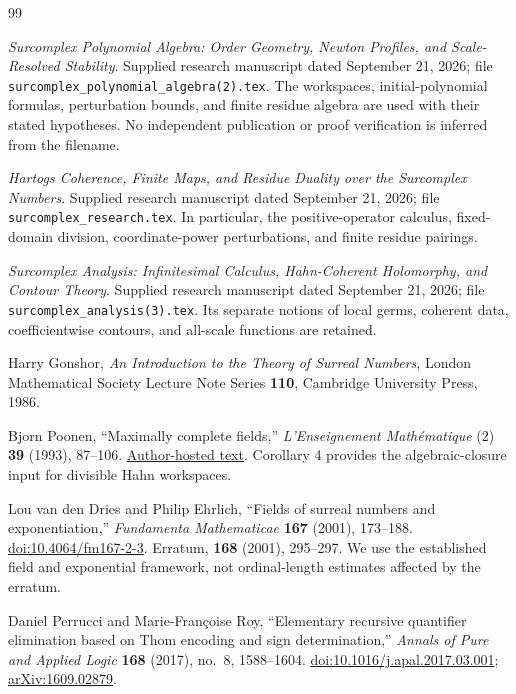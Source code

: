 \documentclass[11pt,letterpaper]{article}
\numberwithin{equation}{section}
\theoremstyle{definition}
\theoremstyle{remark}\newtheorem{remark}[theorem]{Remark}
\begin{document}
\clearpage
\begin{thebibliography}{99}
\small

\emph{Surcomplex Polynomial Algebra: Order Geometry, Newton Profiles, and
Scale-Resolved Stability}. Supplied research manuscript dated September 21,
2026; file \texttt{surcomplex\_polynomial\_algebra(2).tex}. The workspaces,
initial-polynomial formulas, perturbation bounds, and finite residue algebra
are used with their stated hypotheses. No independent publication or proof
verification is inferred from the filename.

\emph{Hartogs Coherence, Finite Maps, and Residue Duality over the Surcomplex
Numbers}. Supplied research manuscript dated September 21, 2026; file
\texttt{surcomplex\_research.tex}. In particular, the positive-operator
calculus, fixed-domain division, coordinate-power perturbations, and finite
residue pairings.

\emph{Surcomplex Analysis: Infinitesimal Calculus, Hahn-Coherent Holomorphy,
and Contour Theory}. Supplied research manuscript dated September 21, 2026;
file \texttt{surcomplex\_analysis(3).tex}. Its separate notions of local germs,
coherent data, coefficientwise contours, and all-scale functions are retained.

Harry Gonshor, \emph{An Introduction to the Theory of Surreal Numbers},
London Mathematical Society Lecture Note Series \textbf{110}, Cambridge
University Press, 1986.

Bjorn Poonen, ``Maximally complete fields,'' \emph{L'Enseignement
Math\'ematique} (2) \textbf{39} (1993), 87--106.
\href{https://math.mit.edu/~poonen/papers/amsval.pdf}{Author-hosted text}.
Corollary 4 provides the algebraic-closure input for divisible Hahn workspaces.

Lou van den Dries and Philip Ehrlich, ``Fields of surreal numbers and
exponentiation,'' \emph{Fundamenta Mathematicae} \textbf{167} (2001), 173--188.
\href{https://doi.org/10.4064/fm167-2-3}{doi:10.4064/fm167-2-3}.
Erratum, \textbf{168} (2001), 295--297. We use the established field and
exponential framework, not ordinal-length estimates affected by the erratum.

Daniel Perrucci and Marie-Fran\c coise Roy, ``Elementary recursive quantifier
elimination based on Thom encoding and sign determination,''
\emph{Annals of Pure and Applied Logic} \textbf{168} (2017), no.~8, 1588--1604.
\href{https://doi.org/10.1016/j.apal.2017.03.001}{doi:10.1016/j.apal.2017.03.001};
\href{https://arxiv.org/abs/1609.02879}{arXiv:1609.02879}.


\end{thebibliography}
\end{document}
